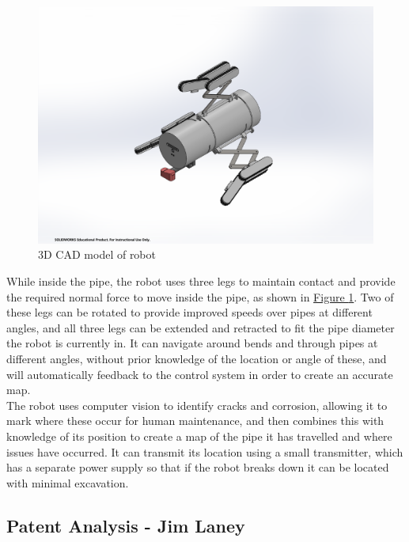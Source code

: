 \documentclass[11pt]{article}		%
\newlength{\imageheight}	 %
\begin{document}
	\begin{figure}[h] %
		\centering
		\includegraphics[height=\imageheight]{overviewCAD}
		\caption{3D CAD model of robot}
		\label{3DSketch}
	\end{figure}
	
	While inside the pipe, the robot uses three legs to maintain contact and provide the required normal force to move inside the pipe, as shown in \hyperref[3DSketch]{Figure \ref*{3DSketch}}.
	Two of these legs can be rotated to provide improved speeds over pipes at different angles, and all three legs can be extended and retracted to fit the pipe diameter the robot is currently in.
	It can navigate around bends and through pipes at different angles, without prior knowledge of the location or angle of these, and will automatically feedback to the control system in order to create an accurate map.
	\\
	The robot uses computer vision to identify cracks and corrosion, allowing it to mark where these occur for human maintenance, and then combines this with knowledge of its position to create a map of the pipe it has travelled and where issues have occurred.
	It can transmit its location using a small transmitter, which has a separate power supply so that if the robot breaks down it can be located with minimal excavation.
	
	\subsection[Patent Analysis]{Patent Analysis - Jim Laney}
	
\end{document}
